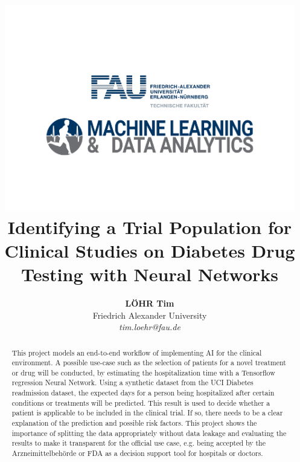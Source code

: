 \documentclass[journal]{IEEEtran}
\begin{document}
    \title{
    	\includegraphics[width=5in]{../imgs/logo_paper3.pdf} 
    	\newline
     Identifying a Trial Population for Clinical Studies on Diabetes Drug Testing with Neural Networks \\ 
     }

  \author{\textbf{L\"OHR Tim} \\ Friedrich Alexander University \\ \textit{tim.loehr@fau.de}}




\maketitle
\begin{abstract}
This project models an end-to-end workflow of implementing AI for the clinical environment. A possible use-case such as the selection of patients for a novel treatment or drug will be conducted, by estimating the hospitalization time with a Tensorflow regression Neural Network.
Using a synthetic dataset from the UCI Diabetes readmission dataset, the expected days for a person being hospitalized after certain conditions or treatments will be predicted. This result is used to decide whether a patient is applicable to be included in the clinical trial. If so, there needs to be a clear explanation of the prediction and possible risk factors.
This project shows the importance of splitting the data appropriately without data leakage and evaluating the results to make it transparent for the official use case, e.g. being accepted by the Arzneimittelbehörde or FDA as a decision support tool for hospitals or doctors. 
\end{abstract}
\end{document}

